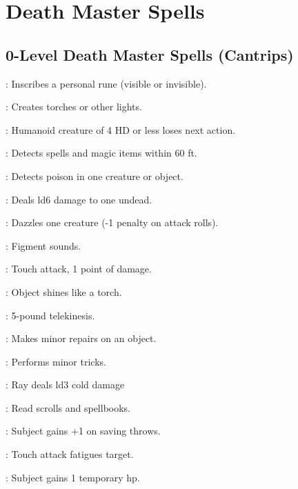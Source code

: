 \section{Death Master Spells}

\begin{multicols}{2}

\subsection{0-Level Death Master Spells (Cantrips)}
\begin{description*}
\item[\linkspell{Arcane Mark}:] Inscribes a personal rune (visible or invisible).
\item[\linkspell{Dancing Lights}:] Creates torches or other lights.
\item[\linkspell{Daze}:] Humanoid creature of 4 HD or less loses next action.
\item[\linkspell{Detect Magic}:] Detects spells and magic items within 60 ft.
\item[\linkspell{Detect Poison}:] Detects poison in one creature or object.
\item[\linkspell{Disrupt Undead}:] Deals ld6 damage to one undead.
\item[\linkspell{Flare}:] Dazzles one creature (-1 penalty on attack rolls).
\item[\linkspell{Ghost Sound}:] Figment sounds.
\item[\linkspell{Inflict Minor Wounds}:] Touch attack, 1 point of damage.
\item[\linkspell{Light}:] Object shines like a torch.
\item[\linkspell{Mage Hand}:] 5-pound telekinesis.
\item[\linkspell{Mending}:] Makes minor repairs on an object.
\item[\linkspell{Prestidigitation}:] Performs minor tricks.
\item[\linkspell{Ray of Frost}:] Ray deals ld3 cold damage
\item[\linkspell{Read Magic}:] Read scrolls and spellbooks.
\item[\linkspell{Resistance}:] Subject gains +1 on saving throws.
\item[\linkspell{Touch of Fatigue}:] Touch attack fatigues target.
\item[\linkspell{Virtue}:] Subject gains 1 temporary hp.
\end{description*}


\end{multicols}

